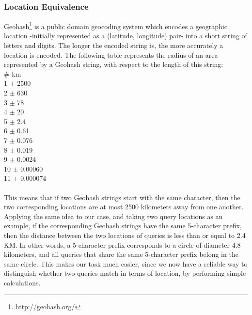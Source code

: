 \subsubsection{Location Equivalence}
Geohash\footnote{http://geohash.org/} is a public domain geocoding system which encodes a geographic location -initially represented as a (latitude, longitude) pair- into a short string of letters and digits. The longer the encoded string is, the more accurately a location is encoded. The following table represents the radius of an area represented by a Geohash string, with respect to the length of this string:\\
\#  \hspace{5pt} km\\      
1   $\pm$ 2500\\
2   $\pm$ 630\\
3   $\pm$ 78\\
4   $\pm$ 20\\
5   $\pm$ 2.4\\
6   $\pm$ 0.61\\
7   $\pm$ 0.076\\
8   $\pm$ 0.019\\
9   $\pm$ 0.0024\\
10  $\pm$ 0.00060\\
11  $\pm$ 0.000074\\
\\
This means that if two Geohash strings start with the same character, then the two corresponding locations are at most 2500 kilometers away from one another. Applying the same idea to our case, and taking two query locations as an example, if the corresponding Geohash strings have the same 5-character prefix, then the distance between the two locations of queries is less than or equal to 2.4 KM. In other words, a 5-character prefix corresponds to a circle of diameter 4.8 kilometers, and all queries that share the same 5-character prefix belong in the same circle. This makes our task much easier, since we now have a reliable way to distinguish whether two queries match in terms of location, by performing simple calculations.
